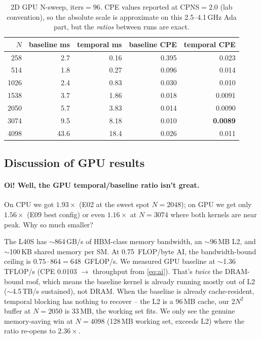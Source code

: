 \documentclass[11pt]{article}
\begin{document}
\begin{table}[h!]
\centering
\renewcommand{\arraystretch}{1.1}
\begin{tabular}{rrrrr}
\toprule
$N$ & baseline ms & temporal ms & baseline CPE & temporal CPE \\
\midrule
 258  &   2.7 & 0.16 & 0.395 & 0.023 \\
 514  &   1.8 & 0.27 & 0.096 & 0.014 \\
1026  &   2.4 & 0.83 & 0.030 & 0.010 \\
1538  &   3.7 & 1.86 & 0.018 & 0.0091 \\
2050  &   5.7 & 3.83 & 0.014 & 0.0090 \\
3074  &   9.5 & 8.18 & 0.010 & \textbf{0.0089} \\
4098  &  43.6 &18.4  & 0.026 & 0.011 \\
\bottomrule
\end{tabular}
\caption{2D GPU N-sweep, iters$=96$.  CPE values reported at
CPNS$=2.0$ (lab convention), so the absolute scale is approximate
on this 2.5--4.1\,GHz Ada part, but the \emph{ratios} between runs
are exact.}
\label{tab:gpu-n}
\end{table}

\subsection{Discussion of GPU results}

\paragraph{Oi! Well, the GPU temporal/baseline ratio isn't great.}
On CPU we got $1.93\times$ (E02 at the sweet spot $N{=}2048$); on GPU
we get only $1.56\times$ (E09 best config) or even $1.16\times$ at
$N{=}3074$ where both kernels are near peak.  Why so much smaller?

The L40S has $\sim$864\,GB/s of HBM-class memory bandwidth, an
$\sim$96\,MB L2, and $\sim$100\,KB shared memory per SM.  At 0.75\,
FLOP/byte AI, the bandwidth-bound ceiling is $0.75 \cdot 864 = 648$\,
GFLOP/s.  We measured GPU baseline at $\sim$1.36\,TFLOP/s (CPE 0.0103
$\to$ throughput from \eqref{eq:ai}).  That's \emph{twice} the DRAM-
bound roof, which means the baseline kernel is already running mostly
out of L2 ($\sim$4.5\,TB/s sustained), not DRAM.  When the baseline
is already cache-resident, temporal blocking has nothing to recover
-- the L2 is a 96\,MB cache, our 2$N^2$ buffer at $N{=}2050$ is
33\,MB, the working set fits.  We only see the genuine memory-saving
win at $N{=}4098$ (128\,MB working set, exceeds L2) where the
ratio re-opens to $2.36\times$.
\end{document}

